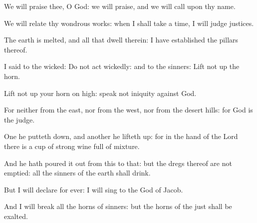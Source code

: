 ﻿\item We will praise thee, O God: we will praise, and we will call upon thy name.
\item We will relate thy wondrous works: when I shall take a time, I will judge justices.
\item The earth is melted, and all that dwell therein: I have established the pillars thereof.
\item I said to the wicked: Do not act wickedly: and to the sinners: Lift not up the horn.
\item Lift not up your horn on high: speak not iniquity against God.
\item For neither from the east, nor from the west, nor from the desert hills: for God is the judge.
\item One he putteth down, and another he lifteth up: for in the hand of the Lord there is a cup of strong wine full of mixture.
\item And he hath poured it out from this to that: but the dregs thereof are not emptied: all the sinners of the earth shall drink.
\item But I will declare for ever: I will sing to the God of Jacob.
\item And I will break all the horns of sinners: but the horns of the just shall be exalted.